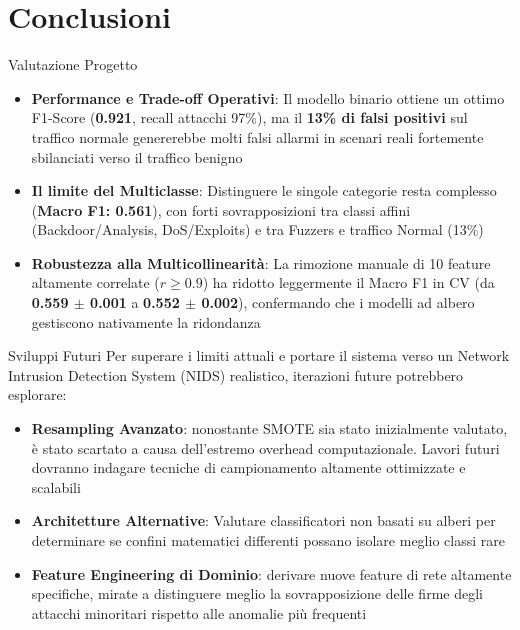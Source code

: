 \documentclass{beamer}
\begin{document}
\section{Conclusioni}

\begin{frame}{Valutazione Progetto}
  \begin{itemize}
    \item \textbf{Performance e Trade-off Operativi}: Il modello binario ottiene un ottimo F1-Score (\textbf{0.921}, recall attacchi 97\%), ma il \textbf{13\% di falsi positivi} sul traffico normale genererebbe molti falsi allarmi in scenari reali fortemente sbilanciati verso il traffico benigno
    \vspace{0.2cm}
    \item \textbf{Il limite del Multiclasse}: Distinguere le singole categorie resta complesso (\textbf{Macro F1: 0.561}), con forti sovrapposizioni tra classi affini (Backdoor/Analysis, DoS/Exploits) e tra Fuzzers e traffico Normal (13\%)
    \vspace{0.2cm}
    \item \textbf{Robustezza alla Multicollinearità}: La rimozione manuale di 10 feature altamente correlate ($r \ge 0.9$) ha ridotto leggermente il Macro F1 in CV (da \textbf{0.559 $\pm$ 0.001} a \textbf{0.552 $\pm$ 0.002}), confermando che i modelli ad albero gestiscono nativamente la ridondanza
  \end{itemize}
\end{frame}

\begin{frame}{Sviluppi Futuri}
  Per superare i limiti attuali e portare il sistema verso un Network Intrusion Detection System (NIDS) realistico, iterazioni future potrebbero esplorare:
  
  \vspace{0.3cm}
  \begin{itemize}
    \item \textbf{Resampling Avanzato}: nonostante SMOTE sia stato inizialmente valutato, è stato scartato a causa dell'estremo overhead computazionale. Lavori futuri dovranno indagare tecniche di campionamento altamente ottimizzate e scalabili
    \vspace{0.2cm}
    \item \textbf{Architetture Alternative}: Valutare classificatori non basati su alberi per determinare se confini matematici differenti possano isolare meglio classi rare
    \vspace{0.2cm}
    \item \textbf{Feature Engineering di Dominio}: derivare nuove feature di rete altamente specifiche, mirate a distinguere meglio la sovrapposizione delle firme degli attacchi minoritari rispetto alle anomalie più frequenti
  \end{itemize}
\end{frame}
\end{document}
